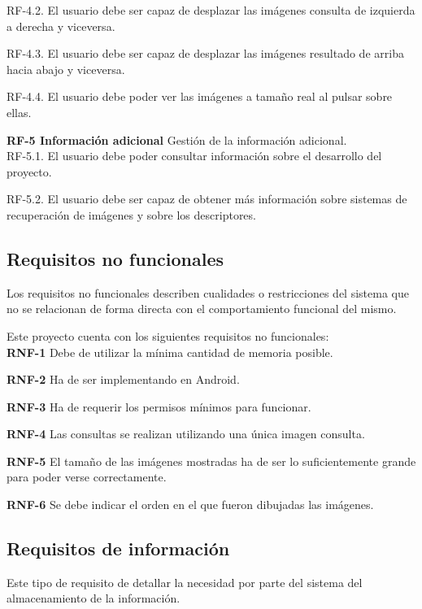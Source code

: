    RF-4.2. El usuario debe ser capaz de desplazar las imágenes consulta de izquierda a derecha y viceversa.
   
   RF-4.3. El usuario debe ser capaz de desplazar las imágenes resultado de arriba hacia abajo y viceversa.
   
   RF-4.4. El usuario debe poder ver las imágenes a tamaño real al pulsar sobre ellas.

\textbf{RF-5 Información adicional} Gestión de la información adicional.\\

   RF-5.1. El usuario debe poder consultar información sobre el desarrollo del proyecto.
   
   RF-5.2. El usuario debe ser capaz de obtener más información sobre sistemas de recuperación de imágenes y sobre los descriptores.
   
           
\subsection{Requisitos no funcionales}
Los requisitos no funcionales describen cualidades o restricciones del sistema que no se relacionan de forma directa con el comportamiento funcional del mismo.

Este proyecto cuenta con los siguientes requisitos no funcionales:\\

\textbf{RNF-1} Debe de utilizar la mínima cantidad de memoria posible.

\textbf{RNF-2} Ha de ser implementando en Android.

\textbf{RNF-3} Ha de requerir los permisos mínimos para funcionar.

\textbf{RNF-4} Las consultas se realizan utilizando una única imagen consulta.
   
\textbf{RNF-5} El tamaño de las imágenes mostradas ha de ser lo suficientemente grande para poder verse correctamente.

\textbf{RNF-6} Se debe indicar el orden en el que fueron dibujadas las imágenes.\\

\subsection{Requisitos de información}

Este tipo de requisito de detallar la necesidad por parte del sistema del almacenamiento de la información. \\

